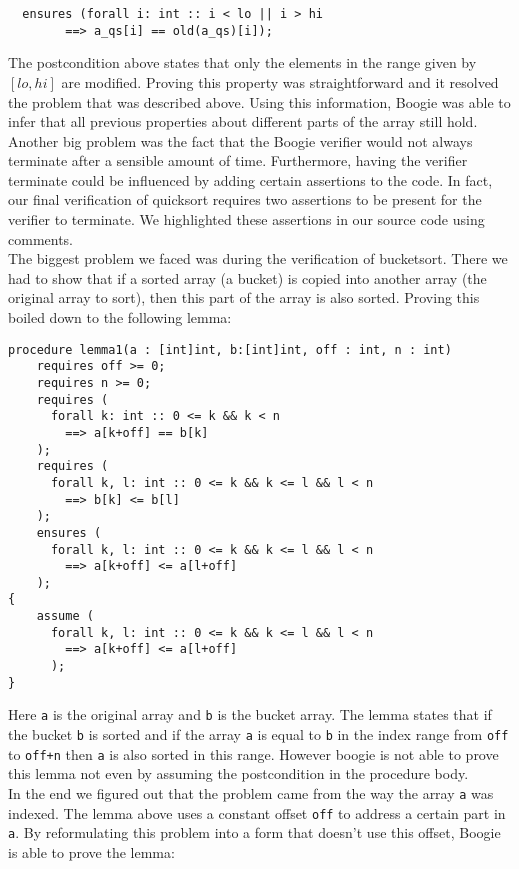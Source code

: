 \begin{verbatim}
  ensures (forall i: int :: i < lo || i > hi
  		==> a_qs[i] == old(a_qs)[i]);
\end{verbatim}

The postcondition above states that only the elements in the range given by $[lo, hi]$ are modified. Proving this
property was straightforward and it resolved the problem that was described above. Using this information, 
Boogie was able to infer that all previous properties about different parts of the array still hold.\\

Another big problem was the fact that the Boogie verifier would not always terminate after a 
sensible amount of time. Furthermore, having the verifier terminate could be influenced by
adding certain assertions to the code. In fact, our final verification of quicksort requires
two assertions to be present for the verifier to terminate. We highlighted these assertions in our
source code using comments.\\

The biggest problem we faced was during the verification of bucketsort. There we had to show
that if a sorted array (a bucket) is copied into another array (the original array to sort), 
then this part of the array is also sorted. Proving this boiled down to the following lemma:

\begin{verbatim}
procedure lemma1(a : [int]int, b:[int]int, off : int, n : int) 
    requires off >= 0;
    requires n >= 0;
    requires (
      forall k: int :: 0 <= k && k < n 
        ==> a[k+off] == b[k]
    );
    requires (
      forall k, l: int :: 0 <= k && k <= l && l < n 
        ==> b[k] <= b[l]
    );
    ensures (
      forall k, l: int :: 0 <= k && k <= l && l < n 
        ==> a[k+off] <= a[l+off]
    );
{
    assume (
      forall k, l: int :: 0 <= k && k <= l && l < n 
        ==> a[k+off] <= a[l+off]
      );
}
\end{verbatim}

Here \texttt{a} is the original array and \texttt{b} is the bucket array. The lemma states that 
if the bucket \texttt{b} is sorted and if the array \texttt{a} is equal to \texttt{b} in
the index range from \texttt{off} to \texttt{off+n} then \texttt{a} is also sorted in this range.
However boogie is not able to prove this lemma not even by assuming the postcondition in the
procedure body.\\

In the end we figured out that the problem came from the way the array \texttt{a} was indexed.
The lemma above uses a constant offset \texttt{off} to address a certain part in \texttt{a}. 
By reformulating this problem into a form that doesn't use this offset, Boogie is able
to prove the lemma:

